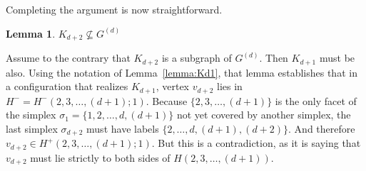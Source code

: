 \pdfoutput=1  \documentclass[]{article}
\newcommand{\ABox}{
\raisebox{3pt}{\framebox[6pt]{\rule{6pt}{0pt}}}
}
\newenvironment{proof}{{\bf Proof:}}{\hfill\ABox}
\newtheorem{lemma}{Lemma}
\newcommand{\lemlab}[1]{\label{lemma:#1}}
\newcommand{\lemref}[1]{\ref{lemma:#1}}
\def\s{{\sigma}}
\begin{document}
Completing the argument is now straightforward.

\begin{lemma}
$K_{d+2} \not\subseteq G^{(d)}$
\lemlab{notKd2}
\end{lemma}
\begin{proof}
Assume to the contrary that $K_{d+2}$ is a subgraph of $G^{(d)}$.
Then $K_{d+1}$ must be also.
Using the notation of Lemma~\lemref{Kd1},
that lemma establishes that in a configuration that
realizes $K_{d+1}$, vertex $v_{d+2}$ lies in 
$H^- = H^-(2,3,\ldots,(d{+}1); 1 )$.
Because $\{ 2,3,\ldots,(d{+}1) \}$ is the only facet of
the simplex  $\s_1 = \{ 1,2,\ldots,d,(d{+}1) \}$ not yet covered by
another simplex, the last simplex $\s_{d+2}$ must have labels
$\{ 2,\ldots,d,(d{+}1),(d{+}2) \}$.
And therefore $v_{d+2} \in H^+(2,3,\ldots,(d{+}1); 1)$.
But this is a contradiction, as it is saying that $v_{d+2}$ must lie
strictly to both sides of $H(2,3,\ldots,(d{+}1))$.
\end{proof}








\end{document}
